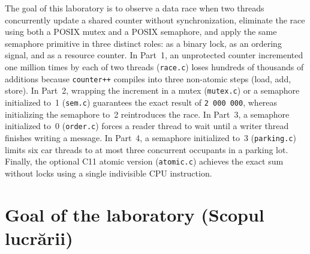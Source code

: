 \documentclass{../latex/utmreport}
\begin{document}
\makeutmreporttitlepage
\tableofcontents
\clearpage
\begin{utmabstract}[Abstract]
The goal of this laboratory is to observe a data race when two threads concurrently update a shared counter without synchronization, eliminate the race using both a POSIX mutex and a POSIX semaphore, and apply the same semaphore primitive in three distinct roles: as a binary lock, as an ordering signal, and as a resource counter. In Part~1, an unprotected counter incremented one million times by each of two threads (\texttt{race.c}) loses hundreds of thousands of additions because \texttt{counter++} compiles into three non-atomic steps (load, add, store). In Part~2, wrapping the increment in a mutex (\texttt{mutex.c}) or a semaphore initialized to~1 (\texttt{sem.c}) guarantees the exact result of \texttt{2\,000\,000}, whereas initializing the semaphore to~2 reintroduces the race. In Part~3, a semaphore initialized to~0 (\texttt{order.c}) forces a reader thread to wait until a writer thread finishes writing a message. In Part~4, a semaphore initialized to~3 (\texttt{parking.c}) limits six car threads to at most three concurrent occupants in a parking lot. Finally, the optional C11 atomic version (\texttt{atomic.c}) achieves the exact sum without locks using a single indivisible CPU instruction.
\end{utmabstract}
\utmintroduction

\section*{Goal of the laboratory (Scopul lucrării)}
\end{document}
